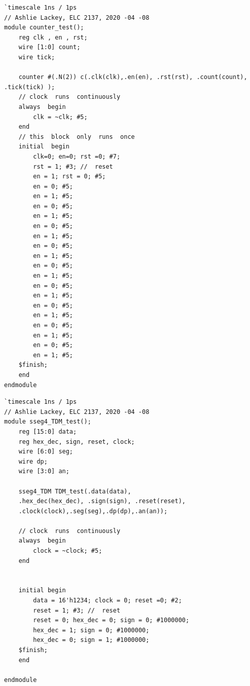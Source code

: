 \documentclass[11pt]{article}
\begin{document}
\begin{lstlisting}[style=Verilog,caption= counter\_test testbench Verilog Code,label=code:ex ]
`timescale 1ns / 1ps
// Ashlie Lackey, ELC 2137, 2020 -04 -08
module counter_test();
	reg clk , en , rst;
	wire [1:0] count;
	wire tick;
	
	counter #(.N(2)) c(.clk(clk),.en(en), .rst(rst), .count(count), .tick(tick) );
	// clock  runs  continuously
	always  begin
		clk = ~clk; #5;
	end
	// this  block  only  runs  once
	initial  begin
		clk=0; en=0; rst =0; #7;
		rst = 1; #3; //  reset
		en = 1; rst = 0; #5;
		en = 0; #5;
		en = 1; #5;
		en = 0; #5;
		en = 1; #5;
		en = 0; #5; 
		en = 1; #5;
		en = 0; #5; 
		en = 1; #5;
		en = 0; #5; 
		en = 1; #5;
		en = 0; #5; 
		en = 1; #5;
		en = 0; #5; 
		en = 1; #5;
		en = 0; #5; 
		en = 1; #5;
		en = 0; #5;
		en = 1; #5;  
	$finish;
	end
endmodule
\end{lstlisting}

\begin{lstlisting}[style=Verilog,caption= sseg4\_TDM\_test Code,label=code:ex ]
`timescale 1ns / 1ps
// Ashlie Lackey, ELC 2137, 2020 -04 -08
module sseg4_TDM_test();
	reg [15:0] data;
	reg hex_dec, sign, reset, clock;
	wire [6:0] seg;
	wire dp;
	wire [3:0] an;
	
	sseg4_TDM TDM_test(.data(data), 
	.hex_dec(hex_dec), .sign(sign), .reset(reset), 
	.clock(clock),.seg(seg),.dp(dp),.an(an));
	
	// clock  runs  continuously
	always  begin
		clock = ~clock; #5;
	end 
	
	
	initial begin
		data = 16'h1234; clock = 0; reset =0; #2;
		reset = 1; #3; //  reset
		reset = 0; hex_dec = 0; sign = 0; #1000000; 
		hex_dec = 1; sign = 0; #1000000;
		hex_dec = 0; sign = 1; #1000000;
	$finish;
	end

endmodule
\end{lstlisting}
\end{document}
